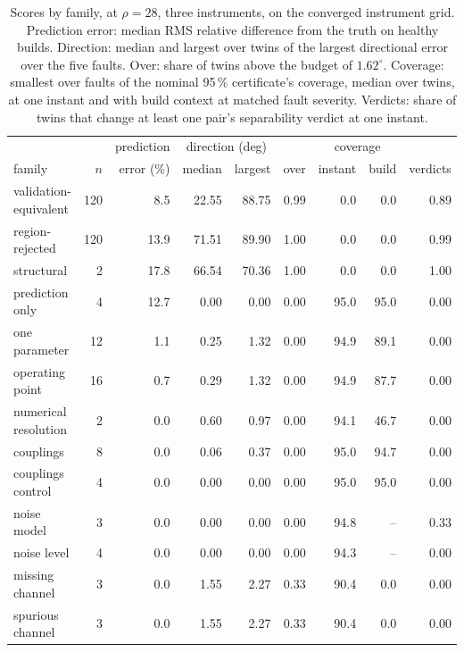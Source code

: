 \documentclass[preprint,12pt]{elsarticle}
\begin{document}
\begin{table}[t]
\centering
\caption{Scores by family, at $\rho = 28$, three instruments, on the converged
instrument grid. Prediction error: median RMS relative difference from the
truth on healthy builds. Direction: median and largest over twins of the
largest directional error over the five faults. Over: share of twins above the
budget of $1.62^\circ$. Coverage: smallest over faults of the nominal 95\,\%
certificate's coverage, median over twins, at one instant and with build
context at matched fault severity. Verdicts: share of twins that change at
least one pair's separability verdict at one instant.}
\label{tab:results}
\footnotesize
\setlength{\tabcolsep}{3.5pt}
\begin{tabular}{@{}lrrrrrrrr@{}}
\toprule
 & & prediction & \multicolumn{2}{c}{direction (deg)} & & \multicolumn{2}{c}{coverage} & \\
\cmidrule(lr){4-5}\cmidrule(lr){7-8}
family & $n$ & error (\%) & median & largest & over & instant & build & verdicts \\
\midrule
validation-equivalent & 120 & 8.5 & 22.55 & 88.75 & 0.99 & 0.0 & 0.0 & 0.89 \\
region-rejected & 120 & 13.9 & 71.51 & 89.90 & 1.00 & 0.0 & 0.0 & 0.99 \\
structural & 2 & 17.8 & 66.54 & 70.36 & 1.00 & 0.0 & 0.0 & 1.00 \\
prediction only & 4 & 12.7 & 0.00 & 0.00 & 0.00 & 95.0 & 95.0 & 0.00 \\
one parameter & 12 & 1.1 & 0.25 & 1.32 & 0.00 & 94.9 & 89.1 & 0.00 \\
operating point & 16 & 0.7 & 0.29 & 1.32 & 0.00 & 94.9 & 87.7 & 0.00 \\
numerical resolution & 2 & 0.0 & 0.60 & 0.97 & 0.00 & 94.1 & 46.7 & 0.00 \\
couplings & 8 & 0.0 & 0.06 & 0.37 & 0.00 & 95.0 & 94.7 & 0.00 \\
couplings control & 4 & 0.0 & 0.00 & 0.00 & 0.00 & 95.0 & 95.0 & 0.00 \\
noise model & 3 & 0.0 & 0.00 & 0.00 & 0.00 & 94.8 & -- & 0.33 \\
noise level & 4 & 0.0 & 0.00 & 0.00 & 0.00 & 94.3 & -- & 0.00 \\
missing channel & 3 & 0.0 & 1.55 & 2.27 & 0.33 & 90.4 & 0.0 & 0.00 \\
spurious channel & 3 & 0.0 & 1.55 & 2.27 & 0.33 & 90.4 & 0.0 & 0.00 \\
\bottomrule
\end{tabular}
\end{table}
\end{document}
